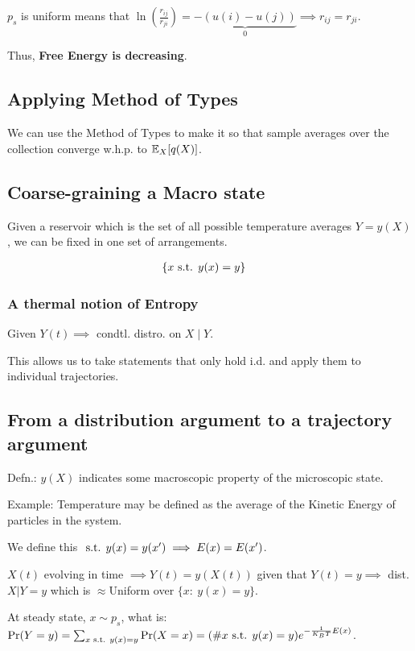$p_s$ is uniform means that $\ln(\frac{r_{ij}}{r_{ji}})=\underbrace{-(u(i)-u(j))}_{0}\implies r_{ij}=r_{ji}$.

Thus, \textbf{Free Energy is decreasing}.

\subsection{Applying Method of Types}
We can use the Method of Types to make it so that sample averages over the collection converge w.h.p. to $\mathbb{E}_X[q(X)]$.

\subsection{Coarse-graining a Macro state}
Given a reservoir which is the set of all possible temperature averages $Y=y(X)$, we can be fixed in one set of arrangements.

\begin{align*}
    &\{x\text{ s.t. } y(x)=y\}
\end{align*}

\subsubsection{A thermal notion of Entropy}
Given $Y(t)\implies$ condtl. distro. on $X\mid Y$.

This allows us to take statements that only hold i.d. and apply them to individual trajectories.

\subsection{From a distribution argument to a trajectory argument}
Defn.: $y(X)$ indicates some macroscopic property of the microscopic state.

\begin{shaded}
Example: Temperature may be defined as the average of the Kinetic Energy of particles in the system.
\end{shaded}

We define this $\text{ s.t. } y(x)=y(x')\implies E(x)=E(x')$.

$X(t)$ evolving in time $\implies Y(t)=y(X(t))$ given that $Y(t)=y\implies$ dist. $X|Y=y$ which is $\approx$Uniform over $\{x: \ y(x)=y\}$.

At steady state, $x\sim p_s$, what is: \\
$\Pr(Y=y)=\sum_{x\text{ s.t. } y(x)=y}\Pr(X=x)=(\# x \text{ s.t. } y(x)=y)e^{-\frac1{K_B T} E(x)}$.

